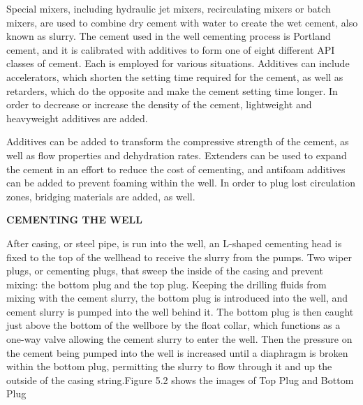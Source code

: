 \vspace{1em}

Special mixers, including hydraulic jet mixers, recirculating mixers or batch mixers,
are used to combine dry cement with water to create the wet cement, also known as slurry. 
The cement used in the well cementing process is Portland cement, and it is calibrated 
with additives to form one of eight different API classes of cement. Each is employed for various situations.
Additives can include accelerators, which shorten the setting time required for the cement,
as well as retarders, which do the opposite and make the cement setting time longer.
In order to decrease or increase the density of the cement, lightweight and heavyweight additives are added.

\vspace{2em}

Additives can be added to transform the compressive strength of the cement,
as well as flow properties and dehydration rates. Extenders can be used to 
expand the cement in an effort to reduce the cost of cementing, and antifoam additives
can be added to prevent foaming within the well. In order to plug lost circulation zones, 
bridging materials are added, as well.

\vspace{1em}

\noindent \textbf{CEMENTING THE WELL}

\vspace{1em}

After casing, or steel pipe, is run into the well, an L-shaped cementing 
head is fixed to the top of the wellhead to receive the slurry from the pumps. 
Two wiper plugs, or cementing plugs, that sweep the
inside of the casing and prevent mixing: the bottom plug and the top plug.
Keeping the drilling fluids from mixing with the cement slurry, 
the bottom plug is introduced into the well, and cement slurry is pumped into the well behind it. 
The bottom plug is then caught just above the bottom of the wellbore by the float collar, 
which functions as a one-way valve allowing the cement slurry to enter the well.
Then the pressure on the cement being pumped into the well is increased until a diaphragm is broken within the bottom plug,
permitting the slurry to flow through it and up the outside of the casing string.Figure 5.2 shows the images of Top  Plug and Bottom Plug

\vspace{1em}

